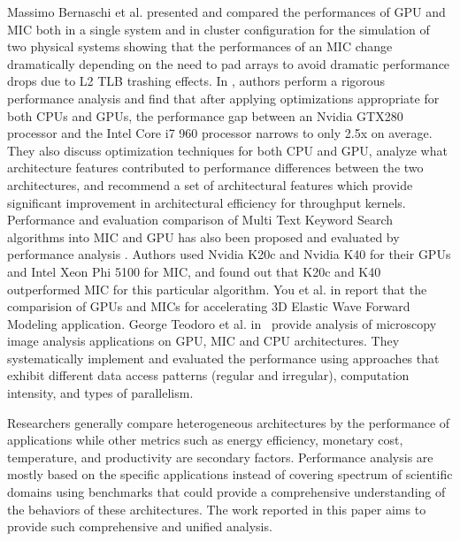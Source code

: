 
Massimo Bernaschi et al. \cite{R:10} presented and compared the performances of GPU and MIC both in a single system and in cluster configuration for the simulation of two physical systems showing that the performances of an MIC change dramatically depending on the need to pad arrays to avoid dramatic performance drops due to L2 TLB trashing effects. In \cite{R:11}, authors perform a rigorous performance analysis and find that after applying optimizations appropriate for both CPUs and GPUs, the performance gap between an Nvidia GTX280 processor and the Intel Core i7 960 processor narrows to only 2.5x on average. They also discuss optimization techniques for both CPU and GPU, analyze what architecture features contributed to performance differences between the two architectures, and recommend a set of architectural features which provide significant improvement in architectural efficiency for throughput kernels. Performance and evaluation comparison of Multi Text Keyword Search algorithms into MIC and GPU has also been proposed and evaluated by performance analysis \cite{R:12}. Authors used Nvidia K20c and Nvidia K40 for their GPUs and Intel Xeon Phi 5100 for MIC, and found out that K20c and K40 outperformed MIC for this particular algorithm. 
You et al. in \cite{R:8} report that the comparision of GPUs and MICs for accelerating 3D Elastic Wave Forward
Modeling application. 
George Teodoro et al. in~\cite{R:9} provide analysis of microscopy image analysis applications on GPU, MIC and CPU architectures. 
They systematically implement and evaluated the performance using approaches that exhibit different data access patterns (regular and irregular), computation intensity, and types of parallelism. %




Researchers generally compare heterogeneous architectures by the performance of 
applications while other metrics such as energy efficiency, 
monetary cost, temperature, and productivity are secondary factors. %
Performance analysis are mostly based on the specific applications instead of covering spectrum of scientific domains using benchmarks
that could provide a comprehensive understanding of the behaviors of these architectures. 
The work reported in this paper aims to provide such comprehensive and unified analysis. 

